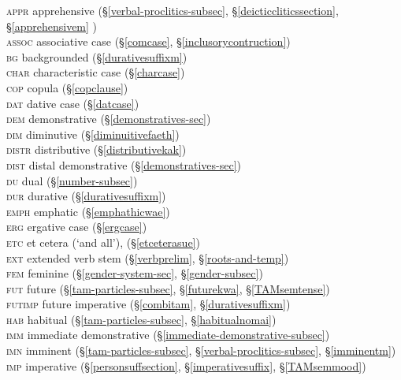 \begin{tabbing}
	\textsc{appr} \> {apprehensive (\S\ref{verbal-proclitics-subsec}, \S\ref{deicticcliticssection}, \S\ref{apprehensivem} )}\\
	\textsc{assoc} \> {associative case (\S\ref{comcase}, \S\ref{inclusorycontruction})}\\
	\textsc{bg} \> {backgrounded (\S\ref{durativesuffixm})}\\
	\textsc{char} \> {characteristic case (\S\ref{charcase})}\\
	\textsc{cop} \> {copula (\S\ref{copclause})}\\
	\textsc{dat} \> {dative case (\S\ref{datcase})}\\
	\textsc{dem} \> {demonstrative (\S\ref{demonstratives-sec})}\\
	\textsc{dim} \> {diminutive (\S\ref{diminuitivefaeth})}\\
	\textsc{distr} \> {distributive (\S\ref{distributivekak})}\\
	\textsc{dist} \> {distal demonstrative (\S\ref{demonstratives-sec})}\\
	\textsc{du} \> {dual (\S\ref{number-subsec})}\\
	\textsc{dur} \> {durative (\S\ref{durativesuffixm})}\\
	\textsc{emph} \> {emphatic (\S\ref{emphathicwae})}\\
	\textsc{erg} \> {ergative case (\S\ref{ergcase})}\\
	\textsc{etc} \> {et cetera (`and all'), (\S\ref{etceterasue})}\\
	\textsc{ext} \> {extended verb stem (\S\ref{verbprelim}, \S\ref{roots-and-temp})}\\
	\textsc{fem} \> {feminine (\S\ref{gender-system-sec}, \S\ref{gender-subsec})}\\
	\textsc{fut} \> {future (\S\ref{tam-particles-subsec}, \S\ref{futurekwa}, \S\ref{TAMsemtense})}\\
	\textsc{futimp} \> {future imperative (\S\ref{combitam}, \S\ref{durativesuffixm})}\\
	\textsc{hab} \> {habitual (\S\ref{tam-particles-subsec}, \S\ref{habitualnomai})}\\
	\textsc{imm} \> {immediate demonstrative (\S\ref{immediate-demonstrative-subsec})}\\
	\textsc{imn} \> {imminent (\S\ref{tam-particles-subsec}, \S\ref{verbal-proclitics-subsec}, \S\ref{imminentm})}\\
	\textsc{imp} \> {imperative (\S\ref{personsuffsection}, \S\ref{imperativesuffix}, \S\ref{TAMsemmood})}\\

\end{tabbing}
